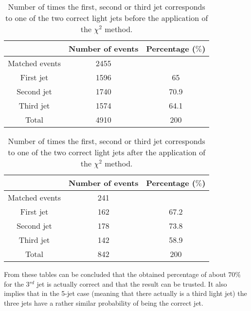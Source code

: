 \begin{table}[h!]
 \centering
 \begin{tabular}{c|c|c}
                 & Number of events & Percentage ($\%$) \\
  \hline
  Matched events & 2455 & \\
  \hline
  First jet      & 1596 & 65   \\
  Second jet     & 1740 & 70.9 \\
  Third jet      & 1574 & 64.1 \\
  \hline
  Total          & 4910 & 200
 \end{tabular}
 \caption{Number of times the first, second or third jet corresponds to one of the two correct light jets before the application of the $\chi^{2}$ method.}\label{table::FirstSecondThirdJetPerc}
\end{table}

\begin{table}[h!]
 \centering
 \begin{tabular}{c|c|c}
                 & Number of events & Percentage ($\%$) \\
  \hline
  Matched events & 241 & \\
  \hline
  First jet      & 162 & 67.2   \\
  Second jet     & 178 & 73.8 \\
  Third jet      & 142 & 58.9 \\
  \hline
  Total          & 842 & 200
 \end{tabular}
 \caption{Number of times the first, second or third jet corresponds to one of the two correct light jets after the application of the $\chi^{2}$ method.}\label{table::FirstSecondThirdJetPercMlb}
\end{table}

From these tables can be concluded that the obtained percentage of about $70\%$ for the 3$^{rd}$ jet is actually correct and that the result can be trusted. It also implies that in the 5-jet case (meaning that there actually is a third light jet) the three jets have a rather similar probability of being the correct jet.

